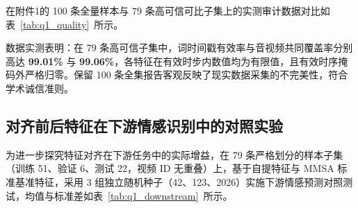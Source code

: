 \documentclass{huawei-mcm}
\begin{document}
在附件1的 100 条全量样本与 79 条高可信可比子集上的实测审计数据对比如表~\ref{tab:q1_quality}~所示。

\begin{table}[htbp]
  \centering
  \caption{附件1多模态数据集免训练信号完整性与对齐质量审计表}
  \label{tab:q1_quality}
\end{table}

数据实测表明：在 79 条高可信子集中，词时间戳有效率与音视频共同覆盖率分别高达 \textbf{99.01\%} 与 \textbf{99.06\%}，各特征在有效时步内数值均为有限值，且有效时序掩码外严格归零。保留 100 条全集报告客观反映了现实数据采集的不完美性，符合学术诚信准则。

\subsection{对齐前后特征在下游情感识别中的对照实验}
为进一步探究特征对齐在下游任务中的实际增益，在 79 条严格划分的样本子集（训练 51、验证 6、测试 22，视频 ID 无重叠）上，基于自提特征与 MMSA 标准基准特征，采用 3 组独立随机种子（42、123、2026）实施下游情感预测对照测试，均值与标准差如表~\ref{tab:q1_downstream}~所示。
\end{document}
